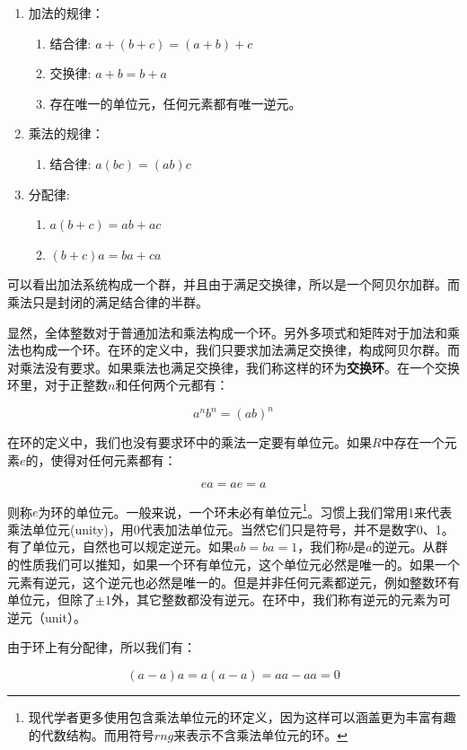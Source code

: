 \documentclass[b5paper]{ctexart}
\begin{document}
\begin{enumerate}
\item 加法的规律：
  \begin{enumerate}
  \item 结合律: $a + (b + c) = (a + b) + c$
  \item 交换律: $a + b = b + a$
  \item 存在唯一的单位元，任何元素都有唯一逆元。
  \end{enumerate}
\item 乘法的规律：
  \begin{enumerate}
  \item 结合律: $a(bc) = (ab)c$
  \end{enumerate}
\item 分配律:
  \begin{enumerate}
  \item $a(b + c) = ab + ac$
  \item $(b + c)a = ba + ca$
  \end{enumerate}
\end{enumerate}

可以看出加法系统构成一个群，并且由于满足交换律，所以是一个阿贝尔加群。而乘法只是封闭的满足结合律的半群。

显然，全体整数对于普通加法和乘法构成一个环。另外多项式和矩阵对于加法和乘法也构成一个环。在环的定义中，我们只要求加法满足交换律，构成阿贝尔群。而对乘法没有要求。如果乘法也满足交换律，我们称这样的环为\textbf{交换环}。在一个交换环里，对于正整数$n$和任何两个元都有：

\[
a^nb^n = (ab)^n
\]

在环的定义中，我们也没有要求环中的乘法一定要有单位元。如果$R$中存在一个元素$e$的，使得对任何元素都有：

\[
ea = ae = a
\]

则称$e$为环的单位元。一般来说，一个环未必有单位元\footnote{现代学者更多使用包含乘法单位元的环定义，因为这样可以涵盖更为丰富有趣的代数结构。而用符号$rng$来表示不含乘法单位元的环。}。习惯上我们常用1来代表乘法单位元(unity)，用0代表加法单位元。当然它们只是符号，并不是数字0、1。有了单位元，自然也可以规定逆元。如果$ab = ba = 1$，我们称$b$是$a$的逆元。从群的性质我们可以推知，如果一个环有单位元，这个单位元必然是唯一的。如果一个元素有逆元，这个逆元也必然是唯一的。但是并非任何元素都逆元，例如整数环有单位元，但除了$\pm 1$外，其它整数都没有逆元。在环中，我们称有逆元的元素为可逆元（unit）。

由于环上有分配律，所以我们有：

\[
(a - a)a = a(a - a) = aa - aa = 0
\]
\end{document}
